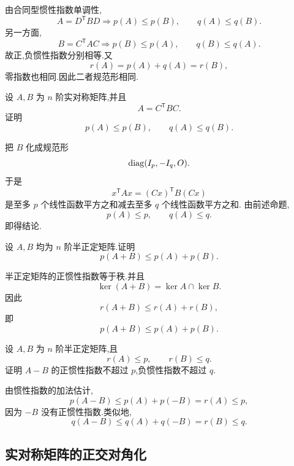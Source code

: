 \begin{solution}
由合同型惯性指数单调性,
\[
A=D^{\mathsf T}BD
\Longrightarrow
p(A)\le p(B),\qquad q(A)\le q(B).
\]
另一方面,
\[
B=C^{\mathsf T}AC
\Longrightarrow
p(B)\le p(A),\qquad q(B)\le q(A).
\]
故正,负惯性指数分别相等.又
\[
r(A)=p(A)+q(A)=r(B),
\]
零指数也相同.因此二者规范形相同.
\end{solution}


\begin{example}[\markstar]
设 $A,B$ 为 $n$ 阶实对称矩阵,并且
\[
A=C^{\mathsf T}BC.
\]
证明
\[
p(A)\le p(B),
\qquad
q(A)\le q(B).
\]
\end{example}
\exampleblank

\begin{solution}
把 $B$ 化成规范形
\[
\operatorname{diag}(I_p,-I_q,O).
\]
于是
\[
x^{\mathsf T}Ax=(Cx)^{\mathsf T}B(Cx)
\]
是至多 $p$ 个线性函数平方之和减去至多 $q$ 个线性函数平方之和.
由前述命题,
\[
p(A)\le p,\qquad q(A)\le q.
\]
即得结论.
\end{solution}


\begin{example}
设 $A,B$ 均为 $n$ 阶半正定矩阵.证明
\[
p(A+B)\le p(A)+p(B).
\]
\end{example}
\exampleblank

\begin{solution}
半正定矩阵的正惯性指数等于秩.并且
\[
\ker(A+B)=\ker A\cap\ker B.
\]
因此
\[
r(A+B)
\le r(A)+r(B),
\]
即
\[
\boxed{p(A+B)\le p(A)+p(B)}.
\]
\end{solution}


\begin{example}
设 $A,B$ 为 $n$ 阶半正定矩阵,且
\[
r(A)\le p,\qquad r(B)\le q.
\]
证明 $A-B$ 的正惯性指数不超过 $p$,负惯性指数不超过 $q$.
\end{example}
\exampleblank

\begin{solution}
由惯性指数的加法估计,
\[
p(A-B)\le p(A)+p(-B)=r(A)\le p,
\]
因为 $-B$ 没有正惯性指数.类似地,
\[
q(A-B)\le q(A)+q(-B)=r(B)\le q.
\]
\end{solution}


\subsection{实对称矩阵的正交对角化}

